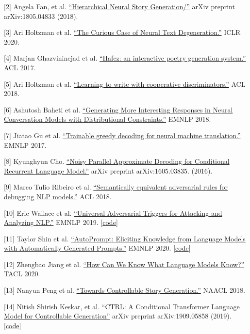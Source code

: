 {[}2{]} Angela Fan, et al. \href{https://arxiv.org/abs/1805.04833}{``Hierarchical Neural Story Generation/''} arXiv preprint arXiv:1805.04833 (2018).

{[}3{]} Ari Holtzman et al. \href{https://arxiv.org/abs/1904.09751}{``The Curious Case of Neural Text Degeneration.''} ICLR 2020.

{[}4{]} Marjan Ghazvininejad et al. \href{https://www.aclweb.org/anthology/P17-4008}{``Hafez: an interactive poetry generation system.''} ACL 2017.

{[}5{]} Ari Holtzman et al. \href{https://arxiv.org/abs/1805.06087}{``Learning to write with cooperative discriminators.''} ACL 2018.

{[}6{]} Ashutosh Baheti et al. \href{https://arxiv.org/abs/1809.01215}{``Generating More Interesting Responses in Neural Conversation Models with Distributional Constraints.''} EMNLP 2018.

{[}7{]} Jiatao Gu et al. \href{https://arxiv.org/abs/1702.02429}{``Trainable greedy decoding for neural machine translation.''} EMNLP 2017.

{[}8{]} Kyunghyun Cho. \href{https://arxiv.org/abs/1605.03835}{``Noisy Parallel Approximate Decoding for Conditional Recurrent Language Model.''} arXiv preprint arXiv:1605.03835. (2016).

{[}9{]} Marco Tulio Ribeiro et al. \href{https://www.aclweb.org/anthology/P18-1079/}{``Semantically equivalent adversarial rules for debugging NLP models.''} ACL 2018.

{[}10{]} Eric Wallace et al. \href{https://arxiv.org/abs/1908.07125}{``Universal Adversarial Triggers for Attacking and Analyzing NLP.''} EMNLP 2019. {[}\href{https://github.com/Eric-Wallace/universal-triggers}{code}{]}

{[}11{]} Taylor Shin et al. \href{https://arxiv.org/abs/2010.15980}{``AutoPrompt: Eliciting Knowledge from Language Models with Automatically Generated Prompts.''} EMNLP 2020. {[}\href{http://ucinlp.github.io/autoprompt}{code}{]}

{[}12{]} Zhengbao Jiang et al. \href{https://arxiv.org/abs/1911.12543}{``How Can We Know What Language Models Know?''} TACL 2020.

{[}13{]} Nanyun Peng et al. \href{https://www.aclweb.org/anthology/W18-1505/}{``Towards Controllable Story Generation.''} NAACL 2018.

{[}14{]} Nitish Shirish Keskar, et al. \href{https://arxiv.org/abs/1909.05858}{``CTRL: A Conditional Transformer Language Model for Controllable Generation''} arXiv preprint arXiv:1909.05858 (2019).{[}\href{https://github.com/salesforce/ctrl}{code}{]}

